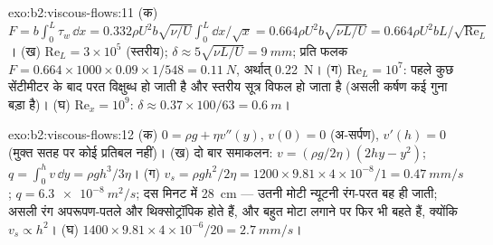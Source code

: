 \begin{solution}{exo:b2:viscous-flows:11}
(क) $F = b\int_0^L\tau_w\,\dd x = 0.332\rho U^2b\sqrt{\nu/U}\int_0^L\dd x/\sqrt x =
0.664\rho U^2b\sqrt{\nu L/U} = 0.664\rho U^2bL/\sqrt{\mathrm{Re}_L}$। (ख) $\mathrm{Re}_L =
3 \times 10^5$ (स्तरीय); $\delta \approx 5\sqrt{\nu L/U} = \qty{9}{mm}$; प्रति फलक $F = 0.664 \times 1000
\times 0.09 \times 1/548 = \qty{0.11}{N}$, अर्थात् \qty{0.22}{N}। (ग) $\mathrm{Re}_L = 10^7$:
पहले कुछ सेंटीमीटर के बाद परत विक्षुब्ध हो जाती है और स्तरीय
सूत्र विफल हो जाता है (असली कर्षण कई गुना बड़ा है)। (घ) $\mathrm{Re}_x =
10^9$: $\delta \approx 0.37 \times 100/63 = \qty{0.6}{m}$।
\end{solution}

\begin{solution}{exo:b2:viscous-flows:12}
(क) $0 = \rho g + \eta v''(y)$, $v(0) = 0$ (अ-सर्पण), $v'(h) = 0$ (मुक्त सतह पर
कोई प्रतिबल नहीं)। (ख) दो बार समाकलन: $v = (\rho g/2\eta)(2hy - y^2)$; $q =
\int_0^hv\,\dd y = \rho gh^3/3\eta$। (ग) $v_s = \rho gh^2/2\eta = 1200 \times 9.81 \times
4 \times 10^{-8}/1 = \qty{0.47}{mm/s}$; $q = \qty{6.3e-8}{m^2/s}$; दस मिनट में
\qty{28}{cm} --- उतनी मोटी न्यूटनी रंग-परत बह ही जाती; असली
रंग अपरूपण-पतले और थिक्सोट्रॉपिक होते हैं, और बहुत मोटा लगाने पर फिर भी बहते हैं,
क्योंकि $v_s \propto h^2$। (घ) $1400 \times 9.81 \times 4 \times 10^{-6}/20 = \qty{2.7}{mm/s}$।
\end{solution}

